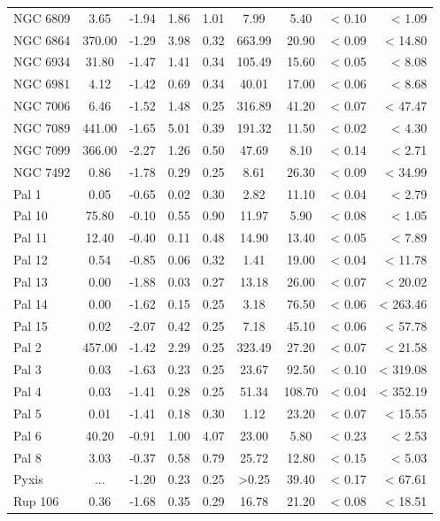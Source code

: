 \documentclass[doublespace,nopageskip]{VTthesis} %
\begin{document}
\begin{appendices}
\begin{center}
\begin{longtable}{lcccccccr}
NGC 6809 & 3.65 & -1.94 & 1.86 & 1.01 & 7.99 & 5.40 & < 0.10 & < 1.09\\
NGC 6864 & 370.00 & -1.29 & 3.98 & 0.32 & 663.99 & 20.90 & < 0.09 & < 14.80\\
NGC 6934 & 31.80 & -1.47 & 1.41 & 0.34 & 105.49 & 15.60 & < 0.05 & < 8.08\\
NGC 6981 & 4.12 & -1.42 & 0.69 & 0.34 & 40.01 & 17.00 & < 0.06 & < 8.68\\
NGC 7006 & 6.46 & -1.52 & 1.48 & 0.25 & 316.89 & 41.20 & < 0.07 & < 47.47\\
NGC 7089 & 441.00 & -1.65 & 5.01 & 0.39 & 191.32 & 11.50 & < 0.02 & < 4.30\\
NGC 7099 & 366.00 & -2.27 & 1.26 & 0.50 & 47.69 & 8.10 & < 0.14 & < 2.71\\
NGC 7492 & 0.86 & -1.78 & 0.29 & 0.25 & 8.61 & 26.30 & < 0.09 & < 34.99\\
Pal 1 & 0.05 & -0.65 & 0.02 & 0.30 & 2.82 & 11.10 & < 0.04 & < 2.79\\
Pal 10 & 75.80 & -0.10 & 0.55 & 0.90 & 11.97 & 5.90 & < 0.08 & < 1.05\\
Pal 11 & 12.40 & -0.40 & 0.11 & 0.48 & 14.90 & 13.40 & < 0.05 & < 7.89\\
Pal 12 & 0.54 & -0.85 & 0.06 & 0.32 & 1.41 & 19.00 & < 0.04 & < 11.78\\
Pal 13 & 0.00 & -1.88 & 0.03 & 0.27 & 13.18 & 26.00 & < 0.07 & < 20.02\\
Pal 14 & 0.00 & -1.62 & 0.15 & 0.25 & 3.18 & 76.50 & < 0.06 & < 263.46\\
Pal 15 & 0.02 & -2.07 & 0.42 & 0.25 & 7.18 & 45.10 & < 0.06 & < 57.78\\
Pal 2 & 457.00 & -1.42 & 2.29 & 0.25 & 323.49 & 27.20 & < 0.07 & < 21.58\\
Pal 3 & 0.03 & -1.63 & 0.23 & 0.25 & 23.67 & 92.50 & < 0.10 & < 319.08\\
Pal 4 & 0.03 & -1.41 & 0.28 & 0.25 & 51.34 & 108.70 & < 0.04 & < 352.19\\
Pal 5 & 0.01 & -1.41 & 0.18 & 0.30 & 1.12 & 23.20 & < 0.07 & < 15.55\\
Pal 6 & 40.20 & -0.91 & 1.00 & 4.07 & 23.00 & 5.80 & < 0.23 & < 2.53\\
Pal 8 & 3.03 & -0.37 & 0.58 & 0.79 & 25.72 & 12.80 & < 0.15 & < 5.03\\
Pyxis & ... & -1.20 & 0.23 & 0.25 & >0.25 & 39.40 & < 0.17 & < 67.61\\
Rup 106 & 0.36 & -1.68 & 0.35 & 0.29 & 16.78 & 21.20 & < 0.08 & < 18.51\\

\end{longtable}
\end{center}
\end{appendices}
\end{document}
